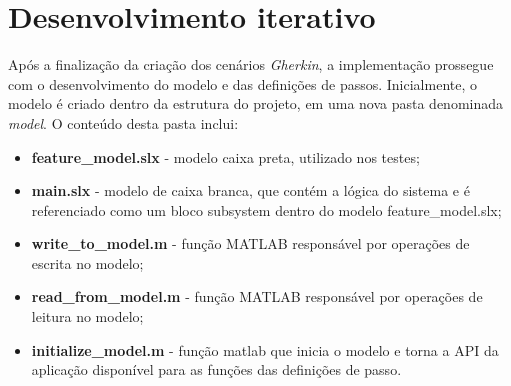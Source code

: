 

\section{Desenvolvimento iterativo}

Após a finalização da criação dos cenários \textit{Gherkin}, a implementação prossegue com o desenvolvimento do modelo e das definições de passos. Inicialmente, o modelo é 
criado dentro da estrutura do projeto, em uma nova pasta denominada \textit{model}. O conteúdo desta pasta inclui:

\begin{itemize}
	\item \textbf{feature\_model.slx} - modelo caixa preta, utilizado nos testes;
	\item \textbf{main.slx} - modelo de caixa branca, que contém a lógica do sistema e é referenciado como um bloco subsystem dentro do modelo feature\_model.slx;
	\item \textbf{write\_to\_model.m} - função MATLAB responsável por operações de escrita no modelo;
	\item \textbf{read\_from\_model.m} - função MATLAB responsável por operações de leitura no modelo;
	\item \textbf{initialize\_model.m} - função matlab que inicia o modelo e torna a API da aplicação disponível para as funções das definições de passo.
\end{itemize}

